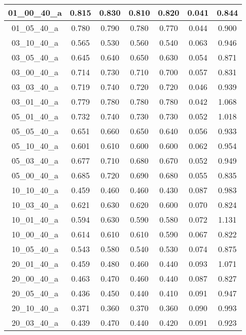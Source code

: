 \begin{table}[H]
{\begin{tabular}{|c|c|c|c|c|c|c|}
01\_00\_40\_a 	& 0.815 	& 0.830 	& 0.810 	& 0.820 	& 0.041 	& 0.844 	 \\ \hline
01\_05\_40\_a 	& 0.780 	& 0.790 	& 0.780 	& 0.770 	& 0.044 	& 0.900 	 \\ \hline
03\_10\_40\_a 	& 0.565 	& 0.530 	& 0.560 	& 0.540 	& 0.063 	& 0.946 	 \\ \hline
03\_05\_40\_a 	& 0.645 	& 0.640 	& 0.650 	& 0.630 	& 0.054 	& 0.871 	 \\ \hline
03\_00\_40\_a 	& 0.714 	& 0.730 	& 0.710 	& 0.700 	& 0.057 	& 0.831 	 \\ \hline
03\_03\_40\_a 	& 0.719 	& 0.740 	& 0.720 	& 0.720 	& 0.046 	& 0.939 	 \\ \hline
03\_01\_40\_a 	& 0.779 	& 0.780 	& 0.780 	& 0.780 	& 0.042 	& 1.068 	 \\ \hline
05\_01\_40\_a	& 0.732 	& 0.740 	& 0.730 	& 0.730 	& 0.052 	& 1.018 	 \\ \hline
05\_05\_40\_a 	& 0.651 	& 0.660 	& 0.650 	& 0.640 	& 0.056 	& 0.933 	 \\ \hline
05\_10\_40\_a 	& 0.601 	& 0.610 	& 0.600 	& 0.600		& 0.062 	& 0.954 	 \\ \hline
05\_03\_40\_a 	& 0.677 	& 0.710 	& 0.680 	& 0.670 	& 0.052 	& 0.949 	 \\ \hline
05\_00\_40\_a 	& 0.685 	& 0.720 	& 0.690 	& 0.680 	& 0.055 	& 0.835 	 \\ \hline
10\_10\_40\_a 	& 0.459 	& 0.460 	& 0.460 	& 0.430 	& 0.087 	& 0.983 	 \\ \hline
10\_03\_40\_a	& 0.621 	& 0.630 	& 0.620 	& 0.600 	& 0.070 	& 0.824 	 \\ \hline
10\_01\_40\_a 	& 0.594 	& 0.630 	& 0.590 	& 0.580 	& 0.072 	& 1.131 	 \\ \hline
10\_00\_40\_a 	& 0.614 	& 0.610 	& 0.610 	& 0.590 	& 0.067 	& 0.822 	 \\ \hline
10\_05\_40\_a 	& 0.543 	& 0.580 	& 0.540 	& 0.530 	& 0.074 	& 0.875 	 \\ \hline
20\_01\_40\_a 	& 0.459 	& 0.480 	& 0.460 	& 0.440 	& 0.093 	& 1.071 	 \\ \hline
20\_00\_40\_a 	& 0.463 	& 0.470 	& 0.460 	& 0.440 	& 0.087 	& 0.827 	 \\ \hline
20\_05\_40\_a 	& 0.436 	& 0.450 	& 0.440 	& 0.410 	& 0.091 	& 0.947 	 \\ \hline
20\_10\_40\_a 	& 0.371 	& 0.360 	& 0.370 	& 0.360 	& 0.090 	& 0.993 	 \\ \hline
20\_03\_40\_a	& 0.439 	& 0.470 	& 0.440 	& 0.420 	& 0.091 	& 0.923 	 \\ \hline
\end{tabular}
}
\end{table}

